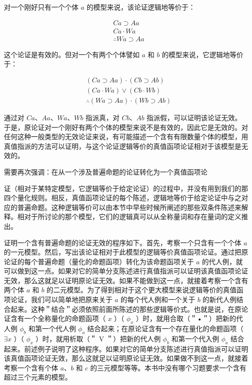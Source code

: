 对一个刚好只有一个个体 $a$ 的模型来说，该论证逻辑地等价于：

$$
\begin{aligned}
& C a \supset A a \\
& C a \cdot W a \\
& \therefore W a \supset A a
\end{aligned}
$$

这个论证是有效的。但对一个有两个个体譬如 $a$ 和 $b$ 的模型来说，它逻辑地等价于：

$$
\begin{aligned}
& (C a \supset A a) \cdot(C b \supset A b) \\
& (C a \cdot W a) \vee(C b \cdot W b) \\
& \therefore(W a \supset A a) \cdot(W b \supset A b)
\end{aligned}
$$

通过对 $C a 、 A a 、 W a 、 W b$ 指派真，对 $C b 、 A b$ 指派假，可以证明该论证无效。于是，原论证对一个刚好有两个个体的模型来说不是有效的，因此它是无效的。对任何这种一般类型的无效论证来说，有可能描述一个含有有限数量个体的模型，用真值指派的方法可以证明，与这个论证逻辑等价的真值函项论证相对于该模型是无效的。

需要再次强调：在从一个涉及普遍命题的论证转化为一个真值函项论

证（相对于某特定模型，它逻辑等价于给定论证）的过程中，并没有用到我们的那四个量化规则。相反，真值函项论证的每个陈述，逻辑地等价于给定论证中与之对应的普遍命题。这种逻辑等价可以由本节中早些时候所阐述的那些双条件陈述来解释。相对于所讨论的那个模型，它们的逻辑真可以从全称量词和存在量词的定义推出。

证明一个含有普遍命题的论证无效的程序如下。首先，考察一个只含有一个个体 $a$ 的一元模型。然后，写出该论证相对于此模型的逻辑等价真值函项论证。通过把原论证的每个普遍命题（量化的命题函项）转化为该命题函项关于 $a$ 的代人例，就可以做到这一点。如果对它的简单分支陈述进行真值指派可以证明该真值函项论证无效，那么这就足以证明原论证无效。如果不能做到这一点，就接着考察一个含有两个体 $a$ 和 $b$ 的二元模型。为了得到相对于这个更大模型来说逻辑等价的真值函项论证，我们可以简单地把原来关于 $a$ 的每个代人例和一个关于 $b$ 的新代人例结合起来。这种＂结合＂必须依照前面所陈述的那些逻辑等价式。也就是说，在原论证含有一个全称量化的命题函项（ $x$ ）（ $\phi_{x}$ ）时，就用合取（＂•＂）把新的代人例 $\phi_{b}$ 和第一个代人例 $\phi_{a}$ 结合起来；在原论证含有一个存在量化的命题函项（ $\exists x$ ）（ $\phi_{x}$ ）时，就用析取（＂ V ＂）把新的代人例 $\phi_{b}$ 和第一个代入例 $\phi_{a}$ 结合起来。前述例子说明了这种程序。如果对它的简单分支陈述进行真值指派可以证明该真值函项论证无效，那么这就足以证明原论证无效。如果做不到这一点，就接着考察一个含有个体 $a 、 b$ 和 $c$ 的三元模型等等。本书中没有哪个习题要求一个含有超过三个元素的模型。 